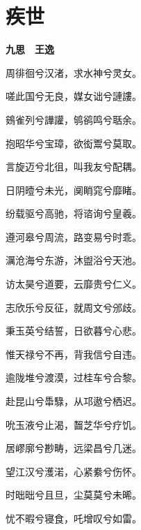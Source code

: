 \documentclass[12pt,a4paper]{ctexbook}
\begin{document}
\section{疾世}
\textbf{九思　王逸}\par\vspace{0.5em}
周徘徊兮汉渚，求水神兮灵女。\par
嗟此国兮无良，媒女诎兮謰謱。\par
鴳雀列兮譁讙，鸲鹆鸣兮聒余。\par
抱昭华兮宝璋，欲衒鬻兮莫取。\par
言旋迈兮北徂，叫我友兮配耦。\par
日阴曀兮未光，阒睄窕兮靡睹。\par
纷载驱兮高驰，将谘询兮皇羲。\par
遵河皋兮周流，路变易兮时乖。\par
濿沧海兮东游，沐盥浴兮天池。\par
访太昊兮道要，云靡贵兮仁义。\par
志欣乐兮反征，就周文兮邠歧。\par
秉玉英兮结誓，日欲暮兮心悲。\par
惟天禄兮不再，背我信兮自违。\par
逾陇堆兮渡漠，过桂车兮合黎。\par
赴昆山兮馽騄，从邛遨兮栖迟。\par
吮玉液兮止渴，齧芝华兮疗饥。\par
居嵺廓兮尠畴，远梁昌兮几迷。\par
望江汉兮濩渃，心紧絭兮伤怀。\par
时昢昢兮且旦，尘莫莫兮未晞。\par
忧不暇兮寝食，吒增叹兮如雷。\par
\end{document}
